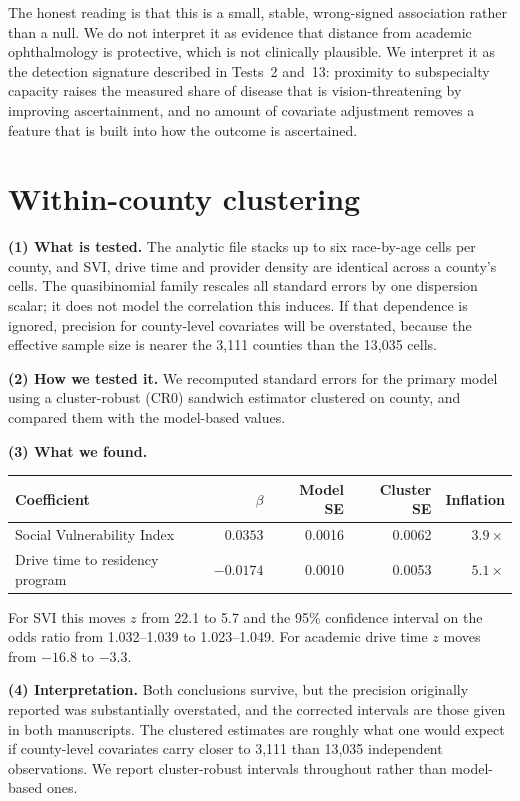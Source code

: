 \documentclass[11pt]{article}
\newcommand{\tpart}[1]{\medskip\noindent\textbf{#1}\quad}
\begin{document}
The honest reading is that this is a small, stable, wrong-signed association
rather than a null. We do not interpret it as evidence that distance from
academic ophthalmology is protective, which is not clinically plausible. We
interpret it as the detection signature described in Tests~2 and~13: proximity
to subspecialty capacity raises the measured share of disease that is
vision-threatening by improving ascertainment, and no amount of covariate
adjustment removes a feature that is built into how the outcome is ascertained.

\section{Within-county clustering}

\tpart{(1) What is tested.} The analytic file stacks up to six race-by-age
cells per county, and SVI, drive time and provider density are identical across
a county's cells. The quasibinomial family rescales all standard errors by one
dispersion scalar; it does not model the correlation this induces. If that
dependence is ignored, precision for county-level covariates will be
overstated, because the effective sample size is nearer the 3,111 counties than
the 13,035 cells.

\tpart{(2) How we tested it.} We recomputed standard errors for the primary
model using a cluster-robust (CR0) sandwich estimator clustered on county, and
compared them with the model-based values.

\tpart{(3) What we found.}
\begin{center}
\begin{tabular}{lrrrr}
\toprule
Coefficient & $\beta$ & Model SE & Cluster SE & Inflation \\
\midrule
Social Vulnerability Index      & $0.0353$  & 0.0016 & 0.0062 & $3.9\times$ \\
Drive time to residency program & $-0.0174$ & 0.0010 & 0.0053 & $5.1\times$ \\
\bottomrule
\end{tabular}
\end{center}
For SVI this moves $z$ from 22.1 to 5.7 and the 95\% confidence interval on the
odds ratio from 1.032--1.039 to 1.023--1.049. For academic drive time $z$ moves
from $-16.8$ to $-3.3$.

\tpart{(4) Interpretation.} Both conclusions survive, but the precision
originally reported was substantially overstated, and the corrected intervals
are those given in both manuscripts. The clustered estimates are roughly what
one would expect if county-level covariates carry closer to 3,111 than 13,035
independent observations. We report cluster-robust intervals throughout rather
than model-based ones.
\end{document}
